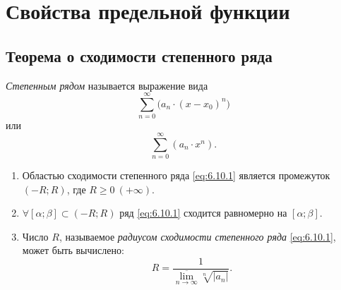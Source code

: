 \section{Свойства предельной функции}

\setcounter{subsection}{94}

\subsection{Теорема о сходимости степенного ряда}

\begin{definition}
    \emph{Степенным рядом} называется выражение вида
    \[
        \sum_{n=0}^{\infty}\big(a_n\cdot (x-x_0)^n\big)
    \]
    или
    \begin{equation}\label{eq:6.10.1}
        \sum_{n=0}^{\infty}(a_n \cdot x^n).
    \end{equation}
\end{definition}

\begin{theorem}\label{theorem:6.10.1}\leavevmode
    \begin{enumerate}
        \item Областью сходимости степенного ряда \ref{eq:6.10.1} является промежуток $(-R;R)$, где $R \geqslant 0 \ (+ \infty)$.
        \item $\forall [\alpha;\beta] \subset (-R;R)$ ряд \ref{eq:6.10.1} сходится равномерно на $[\alpha;\beta]$.
        \item Число $R$, называемое \emph{радиусом сходимости степенного ряда} \ref{eq:6.10.1}, может быть вычислено:
              \[
                  R = \frac{1}{\underset{n\rightarrow\infty}{\overline{\lim}}\sqrt[n]{|a_n|}}.
              \]
    \end{enumerate}
\end{theorem}

